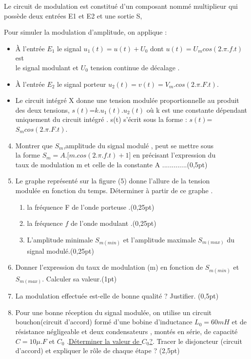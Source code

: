\documentclass[12pt]{article}
\begin{document}
Le circuit de modulation est constitué d’un composant nommé multiplieur
qui possède deux entrées E1 et E2 et une sortie S,

Pour simuler la modulation d’amplitude, on applique :
\begin{itemize}

	\item À l’entrée $E_1$ le signal $u_1(t)=u(t)+U_0$ dont $u(t)=U_mcos(2.\pi.f.t)$ est\\ le
signal modulant et $U_0$ tension continue de décalage .
\item À l’entrée $E_2$ le signal porteur $u_2(t)=v(t)=V_m.cos(2.\pi.F.t)$.
\item Le circuit intégré X donne une tension modulée proportionnelle
au produit des deux tensions, $s(t)$=$ k.u_1(t).u_2(t)$ où k est une
constante dépendant uniquement du circuit intégré . s(t) s’écrit
sous la forme : $s(t)$=$S_mcos(2.\pi.F.t)$.
\end{itemize}

\begin{enumerate}

    \setcounter{enumi}{3}
  \item Montrer que $S_m$,amplitude du signal modulé , peut se
mettre sous \\la forme $S_m = A.\big[m.cos(2.\pi.f.t)+1\big]$ en précisant
    l’expression du \\taux de modulation m et celle de la constante A .............(0,5pt)
  \item Le graphe représenté sur la figure (5) donne l’allure de la
tension \\modulée en fonction du temps. Déterminer à partir de ce
graphe .
\begin{enumerate}
  \item la fréquence F de l’onde porteuse .\dotfill(0,25pt)
  \item la fréquence $f$ de l’onde modulant .\dotfill(0,25pt)
  \item L’amplitude minimale $S_{m(min)}$ et l’amplitude maximale $S_{m(max)}$ du signal modulé.\dotfill(0,25pt)

\end{enumerate}
    \item Donner l’expression du taux de modulation (m) en fonction de $S_{m(min)}$ et $S_{m(max)}$. Calculer sa valeur.\dotfill(1pt)

    \item La modulation effectuée est-elle de bonne qualité ? Justifier. \dotfill(0,5pt)

    \item Pour une bonne réception du signal modulée, on utilise un
circuit bouchon(circuit d'accord) formé d'une bobine
d'inductance $L_0 = 60mH$ et de résistance négligeable et
deux condensateurs , montés en série, de capacité $C =10\mu.F$
    et $C_0$ .\underline{Déterminer la valeur de $C_0$?}. Tracer le disjoncteur (circuit d'accord) et expliquer le rôle de chaque étape ? \dotfill(2,5pt)

\end{enumerate}
\end{document}
